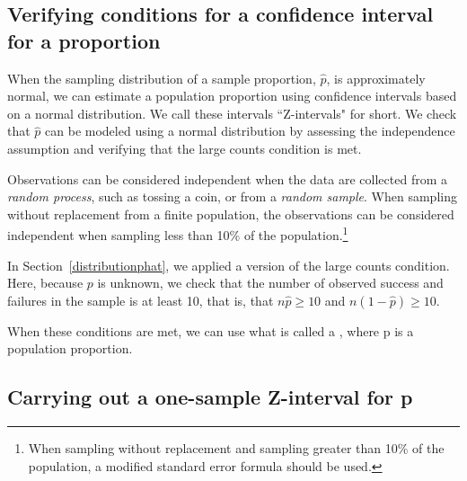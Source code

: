 \D{\newpage}

\subsection[Verifying conditions for a confidence interval for a proportion]{Verifying conditions for a confidence interval for a proportion}

When the sampling distribution of a sample proportion, $\hat{p}$, is approximately normal, we can estimate a population proportion using confidence intervals based on a normal distribution.  We call these intervals ``Z-intervals" for short.  We check that $\hat{p}$ can be modeled using a normal distribution by assessing the independence assumption and verifying that the large counts condition is met. 

\begin{description}
\setlength{\itemsep}{0mm}
\item[Independence.] Observations can be considered independent when the data are collected from a \emph{random process}, such as tossing a coin, or from a \emph{random sample}.  When sampling without replacement from a finite population, the observations can be considered independent when sampling less than 10\% of the population.\footnote{When sampling without replacement and sampling greater than 10\% of the population, a modified standard error formula should be used.}
\item[Large counts.] In Section~\ref{distributionphat}, we applied a version of the large counts condition.  Here, because $p$ is unknown, we check that the number of observed success and failures in the sample is at least 10, that is, that $n\hat{p} \ge 10$ and $n(1-\hat{p}) \ge 10$.
\end{description}

When these conditions are met, we can use what is called a , where p is a population proportion.\D{\vspace{8mm}}


\subsection[Carrying out a one-sample Z-interval for p]{Carrying out a one-sample Z-interval for p}
\label{confIntForPropSection}


